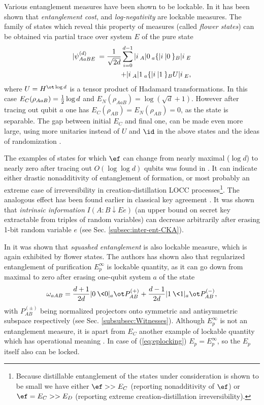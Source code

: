 \documentclass[twocolumn,aps,rmp]{revtex4}
\begin{document}
Various entanglement measures have been shown to be lockable.
In \cite{lock-ent} it has been shown that {\it
entanglement cost}, and {\it log-negativity} are lockable measures.
The family of states which reveal this property of measures (called
{\it flower states}) can be obtained via partial trace over system $E$
of the pure state
\begin{eqnarray}
|\psi_{AaBE}^{(d)}\> = {1\over \sqrt{2d}}\sum_{i=0}^{d-1} |i\>_A|0\>_a\{|i\>|0\>\}_B|i\>_E
\label{eq:flower-purif} \\+ |i\>_A|1\>_a \{|i\>|1\>\}_B U|i\>_E,
\nonumber
\end{eqnarray}
where $U=H^{\ot \log d}$ is a tensor product of Hadamard
transformations. In this case $E_C(\rho_{AaB}) = {1\over 2}\log d $
and $E_N(\rho_{AaB})= \log (\sqrt{d} +1)$.  However after tracing
out qubit $a$ one has $E_C(\rho_{AB})=E_N(\rho_{AB})=0$, as the state
is separable. The gap between initial $E_C$ and final one, can be made
even more large, using more unitaries instead of $U$ and $\id$ in the
above states and the ideas of randomization \cite{RandomQstates}.

The examples of states for which $\ef$ can change from nearly maximal
($\log d $) to nearly zero after tracing out $O(\log \log d)$ qubits
was found in \cite{AspGenEnt}. It can indicate either drastic
nonadditivity of entanglement of formation, or most probably an
extreme case of irreversibility in creation-distillation LOCC
processes\footnote{Because distillable entanglement of the states
  under consideration is shown to be small we have either $\ef >>E_C$ (reporting nonadditivity of $\ef$) or $\ef =E_C>>E_D$ (reporting extreme creation-distillation irreversibility).}. The analogous effect has been found earlier in
classical key agreement \cite{renner-wolf-gap}. It was shown that {\it
  intrinsic information} $I(A:B\downarrow Ee)$ (an upper bound on
secret key extractable from triples of random variables) can decrease
arbitrarily after erasing 1-bit random variable $e$ (see Sec. \ref{subsec:inter-ent-CKA}).


In \cite{ChristandlW-lock} it was shown that {\it squashed
entanglement} is also lockable measure, which is again exhibited by
flower states. The authors has shown also that regularized
entanglement of purification $E_p^{\infty}$ is lockable quantity, as it
can go down from maximal to zero after erasing one-qubit system $a$ of
the state
\begin{equation}
\omega_{aAB} = {d+1\over 2d}|0\>\<0|_a \ot
P_{AB}^{(+)} + {d-1\over 2d}|1\>\<1|_a \ot P_{AB}^{(-)},
\label{eq:eplocking}
\end{equation}
with $P_{AB}^{(\pm)}$ being normalized projectors onto symmetric and
antisymmetric subspace respectively (see Sec. \ref{subsubsec:Witnesses}).  Although $E_p^{\infty}$ is not
an entanglement measure, it is apart from $E_C$ another example of
lockable quantity which has operational meaning \cite{IBMHor2002}. In
case of (\ref{eq:eplocking}) $E_p = E_p^{\infty}$, so the $E_p$ itself
also can be locked.
\end{document}
